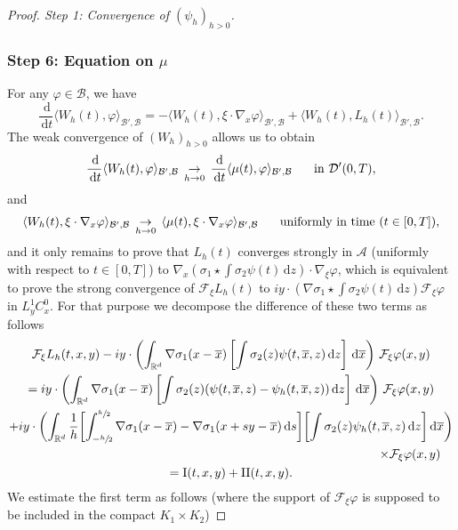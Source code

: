 \documentclass[10pt]{amsart}
\let\bar\oldbar
\theoremstyle{definition}
\let\bar\overline
\newcommand{\R}{\mathbb{R}}
\newcommand{\ud}{\, {\mathrm{d}}}
\begin{document}
\begin{proof}[Proof. Step 1: Convergence of $(\psi_{h})_{h>0}$]
\subsubsection*{Step 6: Equation on $\mu$} For any $\varphi\in\mathcal{B}$, we have
\[
\frac{\ud}{\ud t}\langle W_{h}(t),\varphi\rangle_{\mathcal{B}',\mathcal{B}}=-\langle W_{h}(t),\xi\cdot\nabla_{x}\varphi\rangle_{\mathcal{B}',\mathcal{B}}+\langle W_{h}(t),L_{h}(t)\rangle_{\mathcal{B}',\mathcal{B}}.
\]
The weak convergence of $(W_{h})_{h>0}$ allows us to obtain
\[
\frac{\ud}{\ud t}\langle W_{h}(t),\varphi\rangle_{\mathcal{B}',\mathcal{B}}\,\underset{h\to 0}{\to}\,\frac{\ud}{\ud t}\langle \mu(t),\varphi\rangle_{\mathcal{B}',\mathcal{B}} \hspace{0.5cm}\text{ in }\mathcal{D}'(0,T),
\]
and
\[
\langle W_{h}(t),\xi\cdot\nabla_{x}\varphi\rangle_{\mathcal{B}',\mathcal{B}}\,\underset{h\to 0}{\to}\,\langle \mu(t),\xi\cdot\nabla_{x}\varphi\rangle_{\mathcal{B}',\mathcal{B}} \hspace{0.5cm}\text{ uniformly in time }(t\in[0,T]),
\]
and it only remains to prove that $L_{h}(t)$ converges strongly in $\mathcal{A}$ (uniformly with respect to $t\in[0,T]$) to $\nabla_{x}\left(\sigma_{1}\star\int\sigma_{2}\psi(t)\ud z\right)\cdot\nabla_{\xi}\varphi$, which is equivalent to prove the strong convergence of $\mathcal{F}_{\xi}L_{h}(t)$ to $iy\cdot(\nabla\sigma_{1}\star\int\sigma_{2}\psi(t)\ud z)\mathcal{F}_{\xi}\varphi$ in $L_{y}^{1}C_{x}^{0}$. For that purpose we decompose the difference of these two terms as follows
\bgroup
{}
\begin{multline*}
\mathcal{F}_{\xi}L_{h}(t,x,y)-iy\cdot\left(\int_{\R^{d}}\nabla\sigma_{1}(x-\bar{x})\left[\int\sigma_{2}(z)\psi(t,\bar{x},z)\ud z\right]\ud\bar{x}\right)\,\mathcal{F}_{\xi}\varphi(x,y)\\
=iy\cdot\left(\int_{\R^{d}}\nabla\sigma_{1}(x-\bar{x})\left[\int\sigma_{2}(z)(\psi(t,\bar{x},z)-\psi_{h}(t,\bar{x},z))\ud z\right]\ud\bar{x}\right)\,\mathcal{F}_{\xi}\varphi(x,y)\\
+iy\cdot\biggl(\int_{\R^{d}}\frac{1}{h}\biggl[\int_{-\sfrac{h}{2}}^{\sfrac{h}{2}}\nabla\sigma_{1}(x-\bar{x})-\nabla\sigma_{1}(x+sy-\bar{x})\ud s\biggr]\biggl[\int\sigma_{2}(z)\psi_{h}(t,\bar{x},z)\ud z\biggr]\ud\bar{x}\biggr)\\
\shoveright{\times \mathcal{F}_{\xi}\varphi(x,y)}\\
=\mathrm{I}(t,x,y)+\mathrm{II}(t,x,y).
\end{multline*}
\egroup
We estimate the first term as follows (where the support of $\mathcal{F}_{\xi}\varphi$ is supposed to be included in the compact $K_{1}\times K_{2}$)

\end{proof}
\end{document}
